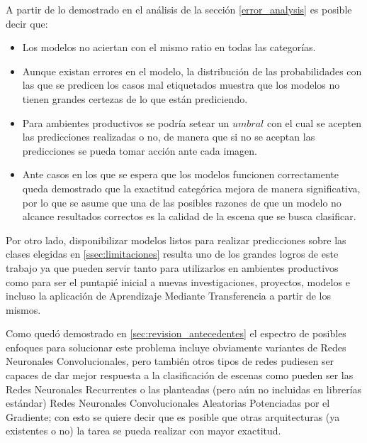 A partir de lo demostrado en el análisis de la sección \ref{error_analysis} es posible decir que:
\begin{itemize}
	\item Los modelos no aciertan con el mismo ratio en todas las categorías.
	\item Aunque existan errores en el modelo, la distribución de las probabilidades con las que se predicen los casos mal etiquetados muestra que los modelos no tienen grandes certezas de lo que están prediciendo.
	\item Para ambientes productivos se podría setear un \(umbral\) con el cual se acepten las predicciones realizadas o no, de manera que si no se aceptan las predicciones se pueda tomar acción ante cada imagen.
	\item Ante casos en los que se espera que los modelos funcionen correctamente 
	queda demostrado que la exactitud categórica mejora de manera significativa, por lo que se asume que una de las posibles razones de que un modelo no alcance resultados correctos es la calidad de la escena que se busca clasificar.
\end{itemize} 

Por otro lado, disponibilizar modelos listos para realizar predicciones sobre las clases elegidas en \ref{ssec:limitaciones} resulta uno de los grandes logros de este trabajo ya que pueden servir tanto para utilizarlos en ambientes productivos como para ser el puntapié inicial a nuevas investigaciones, proyectos, modelos e incluso la aplicación de Aprendizaje Mediante Transferencia a partir de los mismos.

Como quedó demostrado en \ref{sec:revision_antecedentes} el espectro de posibles enfoques para solucionar este problema incluye obviamente variantes de Redes Neuronales Convolucionales, pero también otros tipos de redes pudiesen ser capaces de dar mejor respuesta a la clasificación de escenas como pueden ser las Redes Neuronales Recurrentes o las planteadas (pero aún no incluidas en librerías estándar) Redes Neuronales Convolucionales Aleatorias Potenciadas por el Gradiente; con esto se quiere decir que es posible que otras arquitecturas (ya existentes o no) la tarea se pueda realizar con mayor exactitud. 



